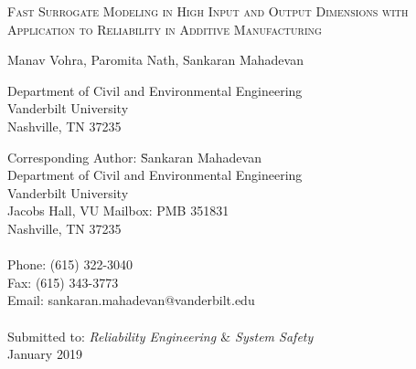 \begin{center}
\textsc{Fast Surrogate Modeling in High Input and Output Dimensions with \\ Application
to Reliability in Additive Manufacturing}

\bigskip 
\bigskip 

Manav Vohra, Paromita Nath, Sankaran Mahadevan

\bigskip
\bigskip

\normalsize
Department of Civil and Environmental Engineering\\
Vanderbilt University\\
Nashville, TN 37235\\

\bigskip

\end{center}

\vspace{6cm}

\begin{tabbing}
Corresponding Author: \hspace{5mm} \= Sankaran Mahadevan\\
       \>  Department of Civil and Environmental Engineering\\
       \>  Vanderbilt University\\
        Jacobs Hall, VU Mailbox: PMB 351831 \\
       \>  Nashville, TN 37235 \\
       \> \\
Phone: \> (615) 322-3040 \\
Fax:   \> (615) 343-3773 \\
Email: \>  sankaran.mahadevan@vanderbilt.edu   \\
\\
Submitted to: \> \textit{Reliability Engineering $\&$ System Safety} \\
\>  January 2019\\

\bigskip
\end{tabbing}

\clearpage

